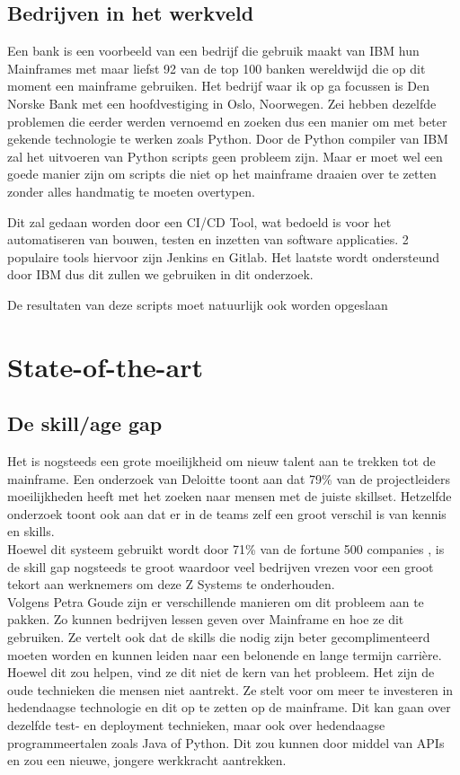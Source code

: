 \subsection{Bedrijven in het werkveld}
Een bank is een voorbeeld van een bedrijf die gebruik maakt van IBM hun Mainframes met maar liefst 92 van de top 100 banken wereldwijd die op dit moment een mainframe gebruiken. \autocite{Wagle2017}
Het bedrijf waar ik op ga focussen is Den Norske Bank met een hoofdvestiging in Oslo, Noorwegen. Zei hebben dezelfde problemen die eerder werden vernoemd en zoeken dus een manier om met beter gekende technologie te werken zoals Python. Door de Python compiler van IBM zal het uitvoeren van Python scripts geen probleem zijn. Maar er moet wel een goede manier zijn om scripts die niet op het mainframe draaien over te zetten zonder alles handmatig te moeten overtypen.

Dit zal gedaan worden door een CI/CD Tool, wat bedoeld is voor het automatiseren van bouwen, testen en inzetten van software applicaties. 2 populaire tools hiervoor zijn Jenkins en Gitlab. \autocite{Mohanan2023} 
Het laatste wordt ondersteund door IBM dus dit zullen we gebruiken in dit onderzoek.

De resultaten van deze scripts moet natuurlijk ook worden opgeslaan



\section{State-of-the-art}%
\label{sec:state-of-the-art}

\subsection{De skill/age gap}
Het is nogsteeds een grote moeilijkheid om nieuw talent aan te trekken tot de mainframe. Een onderzoek van Deloitte toont aan dat 79\% van de projectleiders moeilijkheden heeft met het zoeken naar mensen met de juiste skillset. Hetzelfde onderzoek toont ook aan dat er in de teams zelf een groot verschil is van kennis en skills. \textcite{Deloitte2020} \\ Hoewel dit systeem gebruikt wordt door 71\% van de fortune 500 companies \autocite{Tozzi2022} , is de skill gap nogsteeds te groot waardoor veel bedrijven vrezen voor een groot tekort aan werknemers om deze Z Systems te onderhouden.
\\
Volgens Petra Goude \textcite{Goude2023} zijn er verschillende manieren om dit probleem aan te pakken. Zo kunnen bedrijven lessen geven over Mainframe en hoe ze dit gebruiken. Ze vertelt ook dat de skills die nodig zijn beter gecomplimenteerd moeten worden en kunnen leiden naar een belonende en lange termijn carrière. Hoewel dit zou helpen, vind ze dit niet de kern van het probleem. Het zijn de oude technieken die mensen niet aantrekt. Ze stelt voor om meer te investeren in hedendaagse technologie en dit op te zetten op de mainframe. Dit kan gaan over dezelfde test- en deployment technieken, maar ook over hedendaagse programmeertalen zoals Java of Python. Dit zou kunnen door middel van APIs en zou een nieuwe, jongere werkkracht aantrekken.


